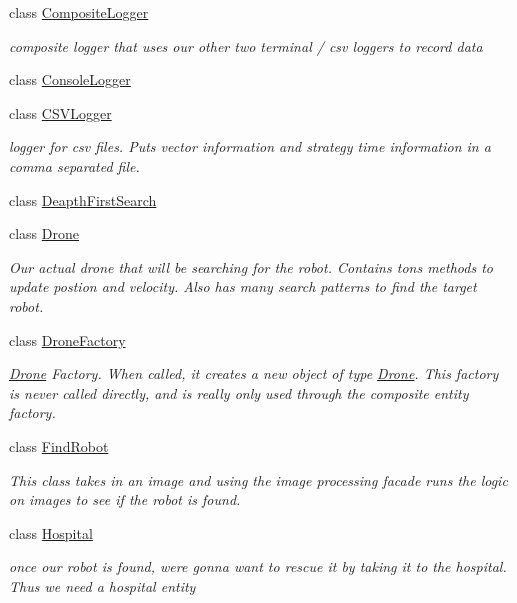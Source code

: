 \begin{DoxyCompactItemize}
class \hyperlink{classCompositeLogger}{Composite\+Logger}
\begin{DoxyCompactList}\small\item\em composite logger that uses our other two terminal / csv loggers to record data \end{DoxyCompactList}\item 
class \hyperlink{classConsoleLogger}{Console\+Logger}
\item 
class \hyperlink{classCSVLogger}{C\+S\+V\+Logger}
\begin{DoxyCompactList}\small\item\em logger for csv files. Puts vector information and strategy time information in a comma separated file. \end{DoxyCompactList}\item 
class \hyperlink{classDeapthFirstSearch}{Deapth\+First\+Search}
\item 
class \hyperlink{classDrone}{Drone}
\begin{DoxyCompactList}\small\item\em Our actual drone that will be searching for the robot. Contains tons methods to update postion and velocity. Also has many search patterns to find the target robot. \end{DoxyCompactList}\item 
class \hyperlink{classDroneFactory}{Drone\+Factory}
\begin{DoxyCompactList}\small\item\em \hyperlink{classDrone}{Drone} Factory. When called, it creates a new object of type \hyperlink{classDrone}{Drone}. This factory is never called directly, and is really only used through the composite entity factory. \end{DoxyCompactList}\item 
class \hyperlink{classFindRobot}{Find\+Robot}
\begin{DoxyCompactList}\small\item\em This class takes in an image and using the image processing facade runs the logic on images to see if the robot is found. \end{DoxyCompactList}\item 
class \hyperlink{classHospital}{Hospital}
\begin{DoxyCompactList}\small\item\em once our robot is found, we\textquotesingle{}re gonna want to rescue it by taking it to the hospital. Thus we need a hospital entity \end{DoxyCompactList}\item 

\end{DoxyCompactItemize}
